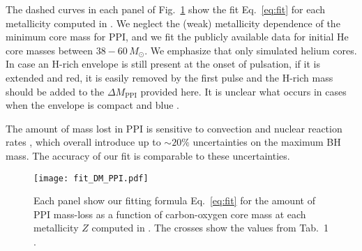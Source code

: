\documentclass[twocolumn]{aastex63}
\DeclareRobustCommand{\Eqref}[1]{Eq.~\ref{#1}}
\DeclareRobustCommand{\Figref}[1]{Fig.~\ref{#1}}
\begin{document}

The dashed curves in each panel of \Figref{fig:fit_DM_PPI} show the
fit \Eqref{eq:fit} for each metallicity computed in
\cite{farmer:19}. We neglect the (weak) metallicity dependence of the
minimum core mass for PPI, and we fit the publicly available data for initial He core
masses between $38-60\,M_\odot$.  We emphasize that \cite{farmer:19}
only simulated helium cores. In case an H-rich envelope is still
present at the onset of pulsation, if it is extended and red, it
is easily removed by the first pulse \citep[][]{woosley:17,renzo:20csm} and the H-rich mass should be added to the
$\Delta M_\mathrm{PPI}$ provided here. It is unclear what occurs in
cases when the envelope is compact and blue \cite{dicarlo:19, renzo:20merger, costa:21}.

The amount of mass lost in PPI is sensitive to convection
\cite{renzo:20conv} and nuclear reaction rates \cite{farmer:19,
  farmer:20, costa:21, woosley:21, mehta:21}, which overall introduce
up to $\sim{}20\%$ uncertainties on the maximum BH mass. The accuracy
of our fit is comparable to these uncertainties.

\begin{figure}[ht!]
    \begin{centering}
      \texttt{[image: fit\_DM\_PPI.pdf]}
      \caption{Each panel show our fitting formula \Eqref{eq:fit} for
        the amount of PPI mass-loss as a function of carbon-oxygen
        core mass at each metallicity $Z$ computed in
        \cite{farmer:19}. The crosses show the values from Tab.~1
        \cite{farmer:19}.}
        \label{fig:fit_DM_PPI}
    \end{centering}
\end{figure}


\end{document}
